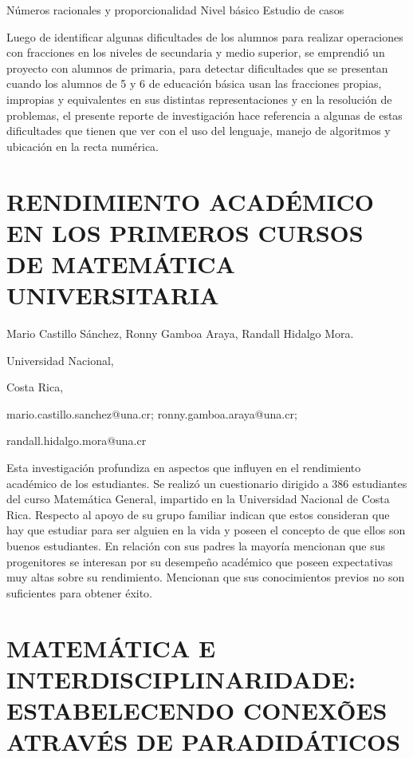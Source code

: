 Números racionales y proporcionalidad Nivel básico Estudio de casos

Luego de identificar algunas dificultades de los alumnos para realizar
operaciones con fracciones en los niveles de secundaria y medio superior,
se emprendió un proyecto con alumnos de primaria, para detectar dificultades
que se presentan cuando los alumnos de 5\textdegree{} y 6\textdegree{}
de educación básica usan las fracciones propias, impropias y equivalentes
en sus distintas representaciones y en la resolución de problemas,
el presente reporte de investigación hace referencia a algunas de
estas dificultades que tienen que ver con el uso del lenguaje, manejo
de algoritmos y ubicación en la recta numérica. 


\section{RENDIMIENTO ACADÉMICO EN LOS PRIMEROS CURSOS DE MATEMÁTICA UNIVERSITARIA }

\begin{datos}

Mario Castillo Sánchez, Ronny Gamboa Araya, Randall Hidalgo Mora.

Universidad Nacional,

Costa Rica,

mario.castillo.sanchez@una.cr; ronny.gamboa.araya@una.cr;

randall.hidalgo.mora@una.cr

\end{datos}

Esta investigación profundiza en aspectos que influyen en el rendimiento
académico de los estudiantes. Se realizó un cuestionario dirigido
a 386 estudiantes del curso Matemática General, impartido en la Universidad
Nacional de Costa Rica. Respecto al apoyo de su grupo familiar indican
que estos consideran que hay que estudiar para ser alguien en la vida
y poseen el concepto de que ellos son buenos estudiantes. En relación
con sus padres la mayoría mencionan que sus progenitores se interesan
por su desempeño académico que poseen expectativas muy altas sobre
su rendimiento. Mencionan que sus conocimientos previos no son suficientes
para obtener éxito.


\section{MATEMÁTICA E INTERDISCIPLINARIDADE: ESTABELECENDO CONEXÕES ATRAVÉS
DE PARADIDÁTICOS}

